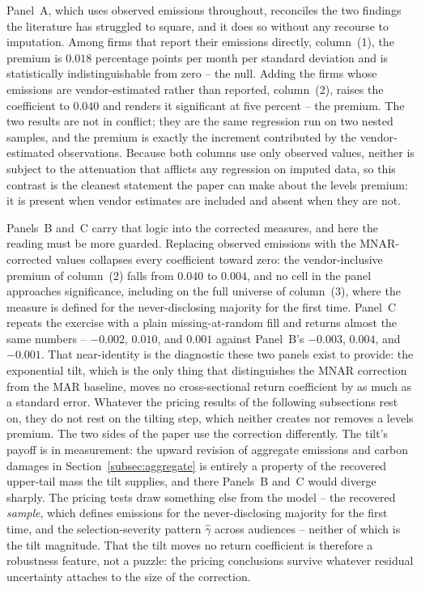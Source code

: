 \documentclass[a4paper,12pt]{article}
\newcommand{\citet}[1]{\textcite{#1}}
\begin{document}
Panel~A, which uses observed emissions throughout, reconciles the two findings the literature has struggled to square, and it does so without any recourse to imputation. Among firms that report their emissions directly, column~(1), the premium is $0.018$ percentage points per month per standard deviation and is statistically indistinguishable from zero -- the \citet{aswani2024carbon} null. Adding the firms whose emissions are vendor-estimated rather than reported, column~(2), raises the coefficient to $0.040$ and renders it significant at five percent -- the \citet{bolton2021investors} premium. The two results are not in conflict; they are the same regression run on two nested samples, and the premium is exactly the increment contributed by the vendor-estimated observations. Because both columns use
only observed values, neither is subject to the attenuation that afflicts any regression on imputed data, so this contrast is the cleanest statement the paper can make about the levels premium: it is present when vendor estimates are included and
absent when they are not.

Panels~B and~C carry that logic into the corrected measures, and here the reading must be more guarded. Replacing observed emissions with the MNAR-corrected values collapses every coefficient toward zero: the vendor-inclusive premium of column~(2) falls from $0.040$ to $0.004$, and no cell in the panel approaches significance, including on the full universe of column~(3), where the measure is defined
for the never-disclosing majority for the first time. Panel~C repeats the exercise with a plain missing-at-random fill and returns almost the same numbers -- $-0.002$, $0.010$, and $0.001$ against Panel~B's $-0.003$, $0.004$, and $-0.001$. That near-identity is the diagnostic these two panels exist to provide: the exponential tilt, which is the only thing that distinguishes the MNAR correction from the MAR
baseline, moves no cross-sectional return coefficient by as much as a standard error. Whatever the pricing results of the following subsections rest on, they do not rest on the tilting step, which neither creates nor removes a levels premium. The two sides of the paper use the correction differently. The tilt's payoff is in measurement: the upward revision of aggregate emissions and carbon damages in Section~\ref{subsec:aggregate} is entirely a property of the recovered upper-tail mass the tilt supplies, and there Panels~B and~C would diverge sharply. The pricing tests draw something else from the model -- the recovered \emph{sample}, which defines emissions for the never-disclosing majority for the first time, and the selection-severity pattern $\hat\gamma$ across audiences -- neither of which is the tilt magnitude. That the tilt moves no return coefficient is therefore a robustness feature, not a puzzle: the pricing conclusions survive whatever residual uncertainty attaches to the size of the correction.
\end{document}
